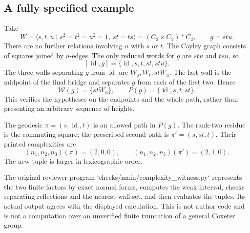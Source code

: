 \documentclass[10pt]{article}
\begin{document}
\subsection*{A fully specified example}
Take \[W=\langle s,t,u\mid s^2=t^2=u^2=1,\ st=ts\rangle
   =(C_2\times C_2)*C_2,\qquad g=stu .\] There are no further relations involving \(u\) with \(s\) or \(t\). The Cayley graph consists of squares joined by \(u\)-edges. The only reduced words for \(g\) are \(stu\) and \(tsu\), so \[[\operatorname{id},g]=\{\operatorname{id},s,t,st,stu\}.\] The three walls separating \(g\) from \(\operatorname{id}\) are \(W_s,W_t,stW_u\). The last wall is the midpoint of the final bridge and separates \(g\) from each of the first two. Hence \[\mathcal W(g)=\{stW_u\},\qquad P(g)=\{\operatorname{id},s,t,st\}.\] This verifies the hypotheses on the endpoints and the whole path, rather than presenting an arbitrary sequence of heights.\par
The geodesic \(\pi=(s,\operatorname{id},t)\) is an allowed path in \(P(g)\). The rank-two residue is the commuting square; the prescribed second path is \(\pi'=(s,st,t)\). Their printed complexities are \[(n_1,n_2,n_3)(\pi)=(2,0,0),\qquad
 (n_1,n_2,n_3)(\pi')=(2,1,0).\] The new tuple is larger in lexicographic order.\par
The original reviewer program `checks/main/complexity\_witness.py` represents the two finite factors by exact normal forms, computes the weak interval, checks separating reflections and the nearest-wall set, and then evaluates the tuples. Its actual output agrees with the displayed calculation. This is not author code and is not a computation over an unverified finite truncation of a general Coxeter group.\par
\end{document}
